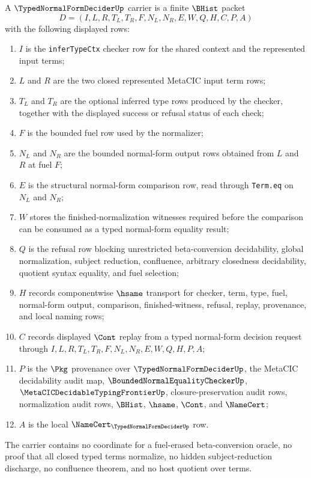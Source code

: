 \begin{definition}
\label{def:typed-normal-form-decider-carrier}
A $\TypedNormalFormDeciderUp$ carrier is a finite $\BHist$ packet
$$
D=(I,L,R,T_L,T_R,F,N_L,N_R,E,W,Q,H,C,P,A)
$$
with the following displayed rows:
\begin{enumerate}
\item $I$ is the \texttt{inferTypeCtx} checker row for the shared context and the represented input terms;
\item $L$ and $R$ are the two closed represented MetaCIC input term rows;
\item $T_L$ and $T_R$ are the optional inferred type rows produced by the checker, together with the displayed success or refusal status of each check;
\item $F$ is the bounded fuel row used by the normalizer;
\item $N_L$ and $N_R$ are the bounded normal-form output rows obtained from $L$ and $R$ at fuel $F$;
\item $E$ is the structural normal-form comparison row, read through \texttt{Term.eq} on $N_L$ and $N_R$;
\item $W$ stores the finished-normalization witnesses required before the comparison can be consumed as a typed normal-form equality result;
\item $Q$ is the refusal row blocking unrestricted beta-conversion decidability, global normalization, subject reduction, confluence, arbitrary closedness decidability, quotient syntax equality, and fuel selection;
\item $H$ records componentwise $\hsame$ transport for checker, term, type, fuel, normal-form output, comparison, finished-witness, refusal, replay, provenance, and local naming rows;
\item $C$ records displayed $\Cont$ replay from a typed normal-form decision request through $I,L,R,T_L,T_R,F,N_L,N_R,E,W,Q,H,P,A$;
\item $P$ is the $\Pkg$ provenance over $\TypedNormalFormDeciderUp$, the MetaCIC decidability audit map, $\BoundedNormalEqualityCheckerUp$, $\MetaCICDecidableTypingFrontierUp$, closure-preservation audit rows, normalization audit rows, $\BHist$, $\hsame$, $\Cont$, and $\NameCert$;
\item $A$ is the local $\NameCert_{\TypedNormalFormDeciderUp}$ row.
\end{enumerate}
The carrier contains no coordinate for a fuel-erased beta-conversion oracle, no proof that all closed typed terms normalize, no hidden subject-reduction discharge, no confluence theorem, and no host quotient over terms.
\end{definition}

